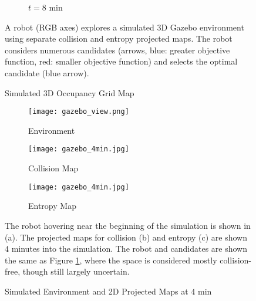 \begin{figure}[!t]
\begin{subfigure}[t]{0.24\columnwidth}
        		\caption{$t=8$ min}
    	\end{subfigure}
	\caption{Simulated 3D Occupancy Grid Map}
	\medskip
	\small
	A robot (RGB axes) explores a simulated 3D Gazebo environment using separate collision and entropy projected maps. The robot considers numerous candidates (arrows, blue: greater objective function, red: smaller objective function) and selects the optimal candidate (blue arrow).
\label{fig:sim3DMap}
\end{figure}


\begin{figure}
	\centering
	\begin{subfigure}[t]{0.3\columnwidth}
           	\centering
          	\texttt{[image: gazebo\_view.png]}
        		\caption{Environment}
		\label{fig:Sim2ProjMapsGazebo}
    	\end{subfigure}
		\hspace*{0.05cm}
    	\begin{subfigure}[t]{0.3\columnwidth}
           	\centering
          	\texttt{[image: gazebo\_4min.jpg]}
        		\caption{Collision Map}
		\label{fig:Sim2ProjMapsCollision}
    	\end{subfigure}
	\hspace*{0.1cm}
	\begin{subfigure}[t]{0.3\columnwidth}
           	\centering
          	\texttt{[image: gazebo\_4min.jpg]}
        		\caption{Entropy Map}
		\label{fig:Sim2ProjMapsEntropy}
    	\end{subfigure}
\caption{Simulated Environment and 2D Projected Maps at $4$ min}
	\medskip
	\small
	The robot hovering near the beginning of the simulation is shown in (a). The projected maps for collision (b) and entropy (c) are shown $4$ minutes into the simulation. The robot and candidates are shown the same as Figure \ref{fig:sim3DMap}, where the space is considered mostly collision-free, though still largely uncertain.
\label{fig:sim2Dmaps}
\end{figure}

